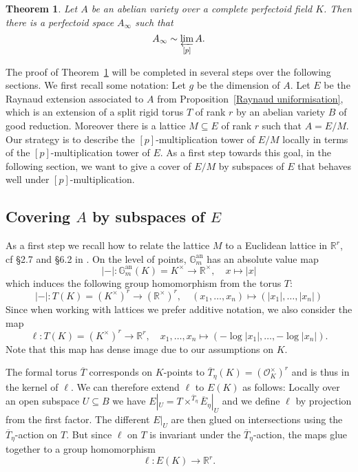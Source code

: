 \documentclass[10pt,oneside]{amsart}
\newtheorem{theorem}{Theorem}[section]
\theoremstyle{definition}
\theoremstyle{remark}
\begin{document}
	\begin{theorem}\label{main theorem}
		Let $A$ be an abelian variety over a complete perfectoid field $K$. Then there is a perfectoid space $A_\infty$ such that
				\[A_\infty \sim \varprojlim_{[p]} A.\]
	\end{theorem}
	
	The proof of Theorem~\ref{main theorem} will be completed in several steps over the following sections.  We first recall some notation:  Let $g$ be the dimension of $A$. Let $E$ be the Raynaud extension associated to $A$ from Proposition~\ref{Raynaud uniformisation}, which is an extension of a split rigid torus $T$ of rank $r$ by an abelian variety $B$ of good reduction. Moreover there is a lattice $M\subseteq E$ of rank $r$ such that $A=E/M$. Our strategy is to describe the $[p]$-multiplication tower of $E/M$ locally in terms of the $[p]$-multiplication tower of $E$.
	As a first step towards this goal, in the following section, we want to give a cover of $E/M$ by subspaces of $E$ that behaves well under $[p]$-multiplication.
	
	\subsection{Covering $A$ by subspaces of $E$}
	As a first step we recall how to relate the lattice $M$ to a Euclidean lattice in $\mathbb R^r$, cf \S2.7 and \S6.2 in  \cite{rigid geometry of curves}. On the level of points, $\mathbb{G}_m^{\operatorname{an}}$ has an absolute value map
	\[|-|:\mathbb{G}_m^{\operatorname{an}}(K)=K^\times\rightarrow \mathbb R^\times, \quad x\mapsto |x|\]
	which induces the following group homomorphism from the torus $T$:
	\[|-|:T(K)=(K^\times)^r\rightarrow (\mathbb R^\times)^r, \quad (x_1,\dots,x_n)\mapsto (|x_1|,\dots,|x_n|)\]
	Since when working with lattices we prefer additive notation, we also consider the map
	\[\ell:T(K)=(K^\times)^r\rightarrow \mathbb R^r, \quad x_1,\dots,x_n\mapsto (-\log |x_1|,\dots,-\log |x_n|).\]
	Note that this map has dense image due to our assumptions on $K$.
	
		The formal torus $\overline{T}$ corresponds on $K$-points to $\overline{T}_\eta(K) = (\mathcal O_K^\times)^r$ and is thus in the kernel of $\ell$. We can therefore extend $\ell$ to $E(K)$ as follows: Locally over an open subspace $U\subseteq B$ we have $E|_U = T\times^{\overline{T}_\eta}\overline{E}_\eta|_{U}$ and we define $\ell$ by projection from the first factor. The different $E|_U$ are then glued on intersections using the $\overline{T}_\eta$-action on $T$. But since $\ell$ on $T$ is invariant under the $\overline{T}_\eta$-action, the maps glue together to a group homomorphism 
	\[\ell:E(K)\rightarrow \mathbb R^r.\]
	
\end{document}
